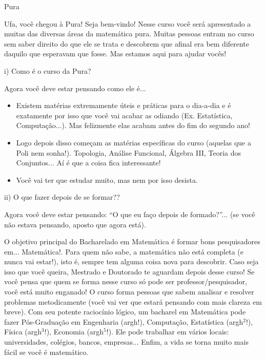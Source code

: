 \begin{subsecao}{Pura}


Ufa, você chegou à Pura! Seja bem-vindo! Nesse curso você será apresentado a muitas das diversas áreas da matemática pura. Muitas pessoas entram no curso sem saber direito do que ele se trata e descobrem que afinal era bem diferente daquilo que esperavam que fosse. Mas estamos aqui para ajudar vocês!

i) Como é o curso da Pura?

Agora você deve estar pensando como ele é...
\begin{itemize}


\item  Existem matérias extremamente úteis e práticas para o dia-a-dia e é
exatamente por isso que você vai acabar as odiando (Ex. Estatística, 
Computação...). Mas felizmente elas acabam antes do fim do segundo ano!
\item  Logo depois disso começam as matérias específicas do curso (aquelas que a Poli nem sonha!). Topologia, Análise Funcional, Álgebra III, Teoria dos Conjuntos... Aí é que a coisa fica interessante!
\item  Você vai ter que estudar muito, mas nem por isso desista.

\end{itemize}
ii) O que fazer depois de se formar??

Agora você deve estar pensando: ``O que eu faço depois de formado?''... (se você
não estava pensando, aposto que agora está).

O objetivo principal do Bacharelado em Matemática é formar bons pesquisadores em... Matemática!. Para quem não
sabe, a matemática não está completa (e nunca vai estar!), isto é, sempre tem alguma coisa nova para
descobrir. Caso seja isso que você queira, Mestrado e Doutorado te aguardam depois desse curso! Se você pensa que quem se forma nesse curso só pode ser
professor/pesquisador, você está muito enganado! O curso forma pessoas que
sabem analisar e resolver problemas metodicamente (você vai ver que estará
pensando com mais clareza em breve). Com seu potente raciocínio lógico, um
bacharel em Matemática pode fazer Pós-Graduação em Engenharia (argh!),
Computação, Estatística (argh$^2$!), Física (argh$^3$!), Economia (argh$^5$!).
Ele pode trabalhar em vários locais: universidades, colégios, bancos,
empresas... Enfim, a vida se torna muito mais fácil se você é matemático.


\end{subsecao}

